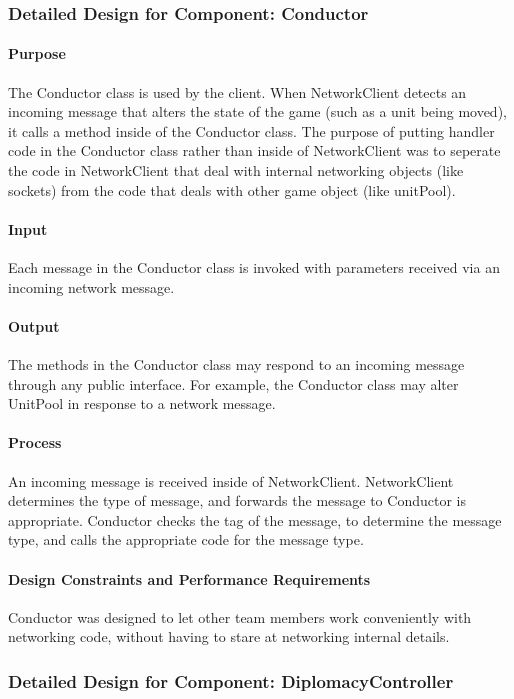 \documentclass[12pt,a4paper,titlepage]{article}
\begin{document}
\subsubsection{Detailed Design for Component: Conductor}
\paragraph{Purpose} The Conductor class is used by the client. When NetworkClient detects an incoming message that alters the state of the game (such as a unit being moved), it calls a method inside of the Conductor class. The purpose of putting handler code in the Conductor class rather than inside of NetworkClient was to seperate the code in NetworkClient that deal with internal networking objects (like sockets) from the code that deals with other game object (like unitPool).
\paragraph{Input} Each message in the Conductor class is invoked with parameters received via an incoming network message.
\paragraph{Output} The methods in the Conductor class may respond to an incoming message through any public interface. For example, the Conductor class may alter UnitPool in response to a network message.
\paragraph{Process} An incoming message is received inside of NetworkClient. NetworkClient determines the type of message, and forwards the message to Conductor is appropriate. Conductor checks the tag of the message, to determine the message type, and calls the appropriate code for the message type.
\paragraph{Design Constraints and Performance Requirements} Conductor was designed to let other team members work conveniently with networking code, without having to stare at networking internal details.

\subsubsection{Detailed Design for Component: DiplomacyController }
\end{document}

